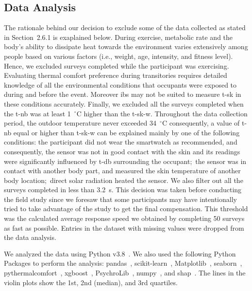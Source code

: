 \documentclass[]{article}
\begin{document}
\subsection{Data Analysis}\label{subsec:data-analysis2}

The rationale behind our decision to exclude some of the data collected as stated in Section~2.6.1 is exaplained below.
During exercise, metabolic rate and the body's ability to dissipate heat towards the environment varies extensively among people based on various factors (i.e., weight, age, intensity, and fitness level).
Hence, we excluded surveys completed while the participant was exercising.
Evaluating thermal comfort preference during transitories requires detailed knowledge of all the environmental conditions that occupants were exposed to during and before the event.
Moreover \glspl{ib} may not be suited to measure \ac{t-sk} in these conditions accurately.
Finally, we excluded all the surveys completed when the \ac{t-nb} was at least 1~$^{\circ}$C higher than the \ac{t-sk-w}.
Throughout the data collection period, the outdoor temperature never exceeded 34~$^{\circ}$C consequently, a value of \ac{t-nb} equal or higher than \ac{t-sk-w} can be explained mainly by one of the following conditions: the participant did not wear the smartwatch as recommended, and consequently, the sensor was not in good contact with the skin and its readings were significantly influenced by \ac{t-db} surrounding the occupant;\ the sensor was in contact with another body part, and measured the skin temperature of another body location;\ direct solar radiation heated the sensor.
We also filter out all the surveys completed in less than 3.2~s.
This decision was taken before conducting the field study since we foresaw that some participants may have intentionally tried to take advantage of the study to get the final compensation.
This threshold was the calculated average response speed we obtained by completing 50 surveys as fast as possible.
Entries in the dataset with missing values were dropped from the data analysis.

We analyzed the data using Python v3.8~\cite{pyhton}.
We also used the following Python Packages to perform the analysis: pandas~\cite{reback2020pandas}, scikit-learn~\cite{scikit-learn}, Matplotlib~\cite{Hunter:2007}, seaborn~\cite{waskom2020seaborn}, pythermalcomfort~\cite{Tartarini2020a}, xgboost~\cite{Chen:2016:XST:2939672.2939785}, PsychroLib~\cite{PsychroLib}, numpy~\cite{harris2020array}, and shap~\cite{NIPS2017_7062}.
The lines in the violin plots show the 1st, 2nd (median), and 3rd quartiles.
\end{document}
